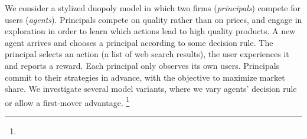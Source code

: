 






 We consider a stylized duopoly model in which two firms (\emph{principals}) compete for users (\emph{agents}). Principals compete on quality rather than on prices, and engage in exploration in order to learn which actions lead to high quality products. A new agent arrives and chooses a principal according to some decision rule. The principal selects an action (\eg a list of web search results), the user experiences it and reports a reward. Each principal only observes its own users. Principals commit to their strategies in advance, with the objective to maximize  market share. We investigate several model variants, %
where we vary agents' decision rule or allow a first-mover advantage.%
\footnote{}



